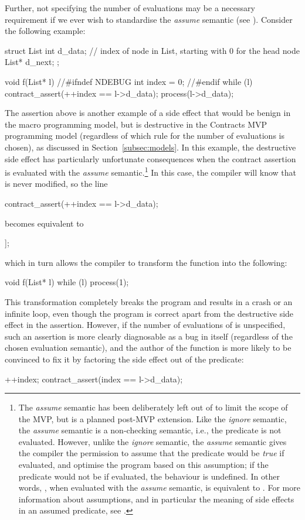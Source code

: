Further, not specifying the number of evaluations may be a necessary requirement if we ever wish to standardise the \emph{assume} semantic (see \cite{P3100R0}). Consider the following example:
\begin{codeblock}
struct List { 
  int d_data;  // index of node in List, starting with 0 for the head node
  List* d_next;
};

void f(List* l) {
//\#ifndef NDEBUG
  int index = 0;
//\#endif
  while (l) {
    contract_assert(++index == l->d_data);
    process(l->d_data);
  }
}
\end{codeblock}
The assertion above is another example of a side effect that would be benign in the macro  programming model, but is destructive in the Contracts MVP programming model (regardless of which rule for the number of evaluations is chosen), as discussed in Section~\ref{subsec:models}. In this example, the destructive side effect has particularly unfortunate consequences when the contract assertion is evaluated with the \emph{assume} semantic.\footnote{The \emph{assume} semantic has been deliberately left out of \cite{P2900R6} to limit the scope of the MVP, but is a planned post-MVP extension. Like the \emph{ignore} semantic, the \emph{assume} semantic is a non-checking semantic, i.e., the predicate is not evaluated. However, unlike the \emph{ignore} semantic, the \emph{assume} semantic gives the compiler the permission to assume that the predicate would be \emph{true} if evaluated, and optimise the program based on this assumption; if the predicate would not be  if evaluated, the behaviour is undefined. In other words, \mbox{}, when evaluated with the \emph{assume} semantic, is equivalent to \tcode{[[assume(X)]]}. For more information about assumptions, and in particular the meaning of side effects in an assumed predicate, see \cite{P1774R8}.} In this case, the compiler will know that  is never modified, so the line 
\begin{codeblock}
contract_assert(++index == l->d_data);
\end{codeblock}
becomes equivalent to
\begin{codeblock}
[[assume(l->d_data == 1)]];
\end{codeblock}
which in turn allows the compiler to transform the function  into the following:
\begin{codeblock}
void f(List* l) {
  while (l) {
    process(1);
  }
}
\end{codeblock}
This transformation completely breaks the program and results in a crash or an infinite loop, even though the program is correct apart from the destructive side effect in the assertion. However, if the number of evaluations of  is  unspecified, such an assertion is more clearly diagnosable as a bug in itself (regardless of the chosen evaluation semantic), and the author of the function  is more likely to be convinced to fix it by factoring the side effect out of the predicate:
\begin{codeblock}
++index;
contract_assert(index == l->d_data);
\end{codeblock}

